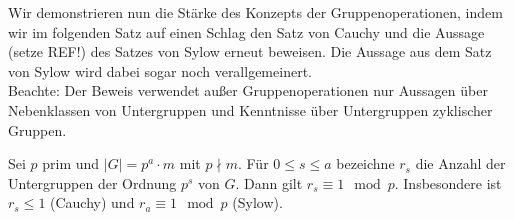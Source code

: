 Wir demonstrieren nun die St\"arke des Konzepts der Gruppenoperationen, indem wir im folgenden Satz auf einen Schlag den Satz von Cauchy und die Aussage (setze REF!) des Satzes von Sylow erneut beweisen. Die Aussage aus dem Satz von Sylow wird dabei sogar noch verallgemeinert.\\
Beachte: Der Beweis verwendet au\ss{}er Gruppenoperationen nur Aussagen \"uber Nebenklassen von Untergruppen und Kenntnisse \"uber Untergruppen zyklischer Gruppen.

\begin{satz} \label{5.9}
 Sei $p$ prim und $|G|=p^a\cdot m$ mit $p\nmid m$. F\"ur $0\leq s\leq a$ bezeichne $r_s$ die Anzahl der Untergruppen der Ordnung $p^s$ von $G$. Dann gilt $r_s \equiv 1 \mod p$. Insbesondere ist $r_s\leq 1$ (Cauchy) und $r_a\equiv 1\mod p$ (Sylow).
\end{satz}

